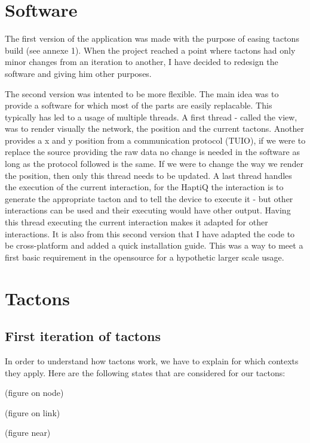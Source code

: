 \section{Software}

The first version of the application was made with the purpose of easing tactons build (see annexe 1). When the project reached a point where tactons had only minor changes from an iteration to another, I have decided to redesign the software and giving him other purposes.

The second version was intented to be more flexible. The main idea was to provide a software for which most of the parts are easily replacable. This typically has led to a usage of multiple threads. A first thread - called the view, was to render visually the network, the position and the current tactons. Another provides a x and y position from a communication protocol (TUIO), if we were to replace the source providing the raw data no change is needed in the software as long as the protocol followed is the same. If we were to change the way we render the position, then only this thread needs to be updated. A last thread handles the execution of the current interaction, for the HaptiQ the interaction is to generate the appropriate tacton and to tell the device to execute it - but other interactions can be used and their executing would have other output. Having this thread executing the current interaction makes it adapted for other interactions. It is also from this second version that I have adapted the code to be cross-platform and added a quick installation guide. This was a way to meet a first basic requirement in the opensource for a hypothetic larger scale usage.

\section{Tactons}

\subsection{First iteration of
tactons}\label{first-iteration-of-tactons}

In order to understand how tactons work, we have to explain for which
contexts they apply. Here are the following states that are considered
for our tactons:

(figure on node)

(figure on link)

(figure near)

